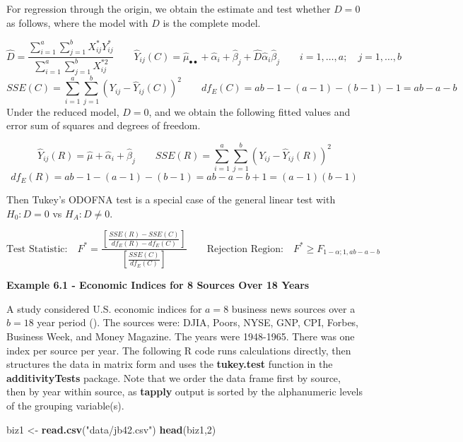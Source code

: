 \documentclass[
]{book}
\newenvironment{Shaded}{\begin{snugshade}}{\end{snugshade}}
\newcommand{\DecValTok}[1]{\textcolor[rgb]{0.00,0.00,0.81}{#1}}
\newcommand{\FunctionTok}[1]{\textcolor[rgb]{0.13,0.29,0.53}{\textbf{#1}}}
\newcommand{\NormalTok}[1]{#1}
\newcommand{\OtherTok}[1]{\textcolor[rgb]{0.56,0.35,0.01}{#1}}
\newcommand{\StringTok}[1]{\textcolor[rgb]{0.31,0.60,0.02}{#1}}
\begin{document}
For regression through the origin, we obtain the estimate and test
whether \(D=0\) as follows, where the model with \(D\) is the complete
model.

\[
\hat{D}=\frac{\sum_{i=1}^a\sum_{j=1}^bX_{ij}^*Y_{ij}^*}{\sum_{i=1}^a\sum_{j=1}^bX_{ij}^{*2}}
\qquad  \hat{Y}_{ij}(C)=\hat{\mu}_{\bullet\bullet}+\hat{\alpha}_i + \hat{\beta}_j +
\hat{D}\hat{\alpha}_i\hat{\beta}_j \qquad i=1,\ldots,a; \quad j=1,\ldots,b
\] \[
SSE(C)=\sum_{i=1}^a\sum_{j=1}^b\left(Y_{ij}-\hat{Y}_{ij}(C)\right)^2  \qquad
df_E(C)=ab-1-(a-1)-(b-1)-1=ab-a-b
\] Under the reduced model, \(D=0\), and we obtain the following fitted
values and error sum of squares and degrees of freedom.

\[
\hat{Y}_{ij}(R)=\hat{\mu} + \hat{\alpha}_i + \hat{\beta}_j
\qquad SSE(R)=\sum_{i=1}^a\sum_{j=1}^b\left(Y_{ij}-\hat{Y}_{ij}(R)\right)^2
\] \[ df_E(R)=ab-1-(a-1)-(b-1)=ab-a-b+1=(a-1)(b-1)
\]

Then Tukey's ODOFNA test is a special case of the general linear test
with \(H_0:D=0\) vs \(H_A:D \ne 0\).

\[
\mbox{Test Statistic:} \quad
F^*=\frac{\left[\frac{SSE(R)-SSE(C)}{df_E(R)-df_E(C)}\right]}
         {\left[\frac{SSE(C)}{df_E(C)}\right]}
\qquad
\mbox{Rejection Region:} \quad F^*\ge F_{1-\alpha;1,ab-a-b}
\]

\textbf{Example 6.1 - Economic Indices for 8 Sources Over 18 Years}

A study considered U.S. economic indices for \(a=8\) business news
sources over a \(b=18\) year period (). The sources were: DJIA, Poors, NYSE, GNP, CPI, Forbes,
Business Week, and Money Magazine. The years were 1948-1965. There was
one index per source per year. The following R code runs calculations
directly, then structures the data in matrix form and uses the
\textbf{tukey.test} function in the \textbf{additivityTests} package.
Note that we order the data frame first by source, then by year within
source, as \textbf{tapply} output is sorted by the alphanumeric levels
of the grouping variable(s).

\begin{Shaded}
\begin{Highlighting}[]
\NormalTok{biz1 }\OtherTok{\textless{}{-}} \FunctionTok{read.csv}\NormalTok{(}\StringTok{"data/jb42.csv"}\NormalTok{)}
\FunctionTok{head}\NormalTok{(biz1,}\DecValTok{2}\NormalTok{)}
\end{Highlighting}
\end{Shaded}
\end{document}
